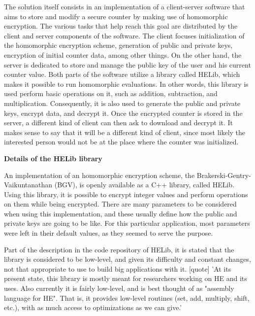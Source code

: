 The solution itself consists in an implementation of a client-server software that aims to store and modify a secure counter by making use of homomorphic encryption. The various tasks that help reach this goal are distributed by the client and server components of the software. The client focuses initialization of the homomorphic encryption scheme, generation of public and private keys, encryption of initial counter data, among other things. On the other hand, the server is dedicated to store and manage the public key of the user and his current counter value. Both parts of the software utilize a library called HELib, which makes it possible to run homomorphic evaluations. In other words, this library is used perform basic operations on it, such as addition, subtraction, and multiplication. Consequently, it is also used to generate the public and private keys, encrypt data, and decrypt it. Once the encrypted counter is stored in the server, a different kind of client can then ask to download and decrypt it. It makes sense to say that it will be a different kind of client, since most likely the interested person would not be at the place where the counter was initialized.



\textbf{Details of the HELib library}

An implementation of an homomorphic encryption scheme, the Brakerski-Gentry-Vaikuntanathan (BGV), is openly available as a C++ library, called HELib. Using this library, it is possible to encrypt integer values and perform operations on them while being encrypted. There are many parameters to be considered when using this implementation, and these usually define how the public and private keys are going to be like. For this particular application, most parameters were left in their default values, as they seemed to serve the purpose. 

Part of the description in the code repository of HELib, it is stated that the library is considered to be low-level, and given its difficulty and constant changes, not that appropriate to use to build big applications with it.  [quote] 'At its present state, this library is mostly meant for researchers working on HE and its uses. Also currently it is fairly low-level, and is best thought of as "assembly language for HE". That is, it provides low-level routines (set, add, multiply, shift, etc.), with as much access to optimizations as we can give.'

